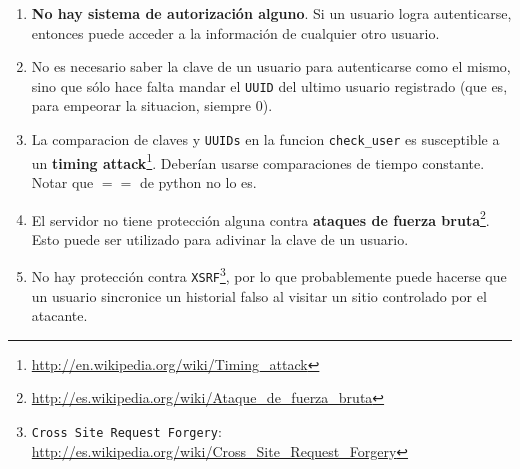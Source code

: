 \documentclass[11pt, a4paper, twoside]{article}
\begin{document}
\begin{enumerate}
\item \textbf{No hay sistema de autorización alguno}. Si un usuario logra autenticarse, entonces puede acceder a la información de cualquier otro usuario.

\item No es necesario saber la clave de un usuario para autenticarse como el mismo, sino que sólo hace falta mandar el \texttt{UUID} del ultimo usuario registrado (que es, para empeorar la situacion, siempre 0).

\item La comparacion de claves y \texttt{UUIDs} en la funcion \texttt{check\_user} es susceptible a un \textbf{timing attack}\footnote{\url{http://en.wikipedia.org/wiki/Timing_attack}}. Deberían usarse comparaciones de tiempo constante. Notar que $==$ de python no lo es.

\item El servidor no tiene protección alguna contra \textbf{ataques de fuerza bruta}\footnote{\url{http://es.wikipedia.org/wiki/Ataque_de_fuerza_bruta}}. Esto puede ser utilizado para adivinar la clave de un usuario.

\item No hay protección contra \texttt{XSRF}\footnote{\texttt{Cross Site Request Forgery}: \url{http://es.wikipedia.org/wiki/Cross_Site_Request_Forgery}}, por lo que probablemente puede hacerse que un usuario sincronice un historial falso al visitar un sitio controlado por el atacante.

\end{enumerate}
\end{document}
